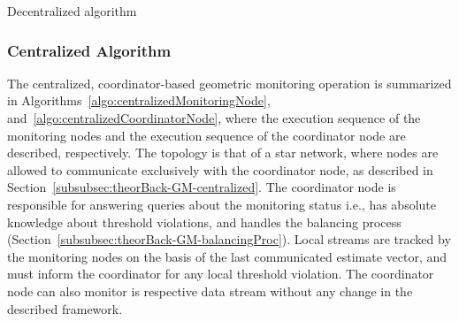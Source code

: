 \begin{algorithm}[H]


\caption{Decentralized algorithm \label{algo:decentralized}} 
\end{algorithm}


\subsubsection{Centralized Algorithm} \label{subsubsec:theorBack-GM-centralizedAlgo}

The centralized, coordinator-based geometric monitoring operation is summarized in Algorithms~\ref{algo:centralizedMonitoringNode},  and~\ref{algo:centralizedCoordinatorNode}, where the execution sequence of the monitoring nodes and the execution sequence of the coordinator node are described, respectively. The topology is that of a star network, where nodes are allowed to communicate exclusively with the coordinator node, as described in Section~\ref{subsubsec:theorBack-GM-centralized}. The coordinator node is responsible for answering queries about the monitoring status i.e., has absolute knowledge about threshold violations, and handles the balancing process (Section~\ref{subsubsec:theorBack-GM-balancingProc}). Local streams are tracked by the monitoring nodes on the basis of the last communicated estimate vector, and must inform the coordinator for any local threshold violation. The coordinator node can also monitor is respective data stream without any change in the described framework.\\

